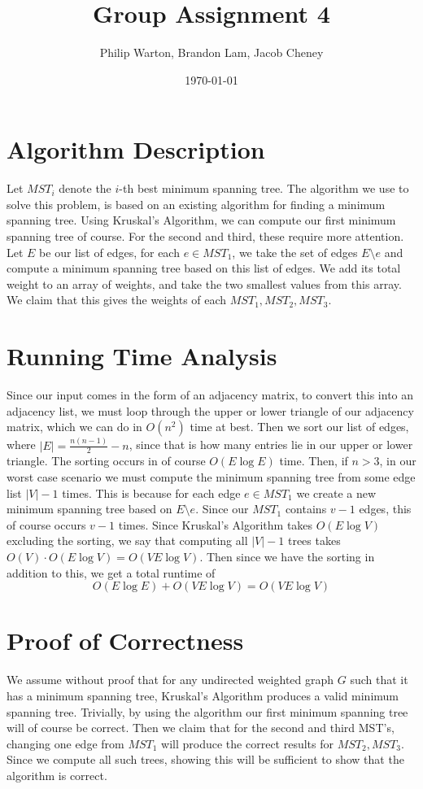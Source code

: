 \documentclass{article}
\theoremstyle{definition}
\begin{document}
\title{Group Assignment 4}
\author{Philip Warton, Brandon Lam, Jacob Cheney}
\date{\today}
\maketitle

\section{Algorithm Description}
    Let $MST_i$ denote the $i$-th best minimum spanning tree. The algorithm we use to solve this problem, is based on an existing algorithm for finding a
    minimum spanning tree. Using Kruskal's Algorithm, we can compute our first minimum spanning tree
    of course. For the second and third, these require more attention. Let $E$ be our list of edges,
    for each $e \in MST_1$, we take the set of edges $E \setminus e$ and compute a minimum spanning tree 
    based on this list of edges. We add its total weight to an array of weights, and take the two smallest
    values from this array. We claim that this gives the weights of each $MST_1, MST_2, MST_3$.
\section{Running Time Analysis}
    Since our input comes in the form of an adjacency matrix, to convert this into an adjacency list, we must loop through the upper or lower triangle
    of our adjacency matrix, which we can do in $O(n^2)$ time at best.
    Then we sort our list of edges, where $|E| = \frac{n(n-1)}{2} - n$, since that is how many entries lie in our upper or lower triangle. The sorting occurs
    in of course $O(E \log E)$ time. Then, if $n > 3$, in our worst case scenario we must compute the minimum spanning tree from some edge list $|V| - 1$ times.
    This is because for each edge $e \in MST_1$ we create a new minimum spanning tree based on $E \setminus e$. Since our $MST_1$ contains $v-1$ edges, this of course 
    occurs $v-1$ times. Since Kruskal's Algorithm takes $O(E \log V)$ excluding the sorting, we say that computing all $|V| - 1$ trees takes $O(V) \cdot O(E \log V) = O(V E \log V)$.
    Then since we have the sorting in addition to this, we get a total runtime of
    \[
        O(E \log E) + O(V E \log V) = O(V E \log V)
    \]
\section{Proof of Correctness}
    We assume without proof that for any undirected weighted graph $G$ such that it has a minimum spanning tree, Kruskal's Algorithm produces a valid minimum spanning tree.
    Trivially, by using the algorithm our first minimum spanning tree will of course be correct. Then we claim that for the second and third MST's, changing one edge from $MST_1$
    will produce the correct results for $MST_2, MST_3$. Since we compute all such trees, showing this will be sufficient to show that the algorithm is correct.
\end{document}
